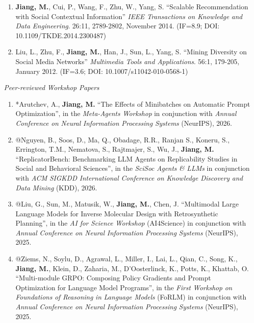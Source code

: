 \documentclass[10pt]{article}
\newenvironment{myindentpar}[1]%
{\begin{list}{}%
         {\setlength{\leftmargin}{#1}}%
         \item[]%
}
{\end{list}}
\newcounter{list}
\begin{document}
\begin{myindentpar}{0.00cm}
\begin{enumerate}[leftmargin=.5cm]
\item[J2] \textbf{Jiang, M.}, Cui, P., Wang, F., Zhu, W., Yang, S. ``Scalable Recommendation with Social Contextual Information'' \textit{IEEE Transactions on Knowledge and Data Engineering}. 26:11, 2789-2802, November 2014. (IF=8.9; DOI: 10.1109/TKDE.2014.2300487)

\item[J1] Liu, L., Zhu, F., \textbf{Jiang, M.}, Han, J., Sun, L., Yang, S. ``Mining Diversity on Social Media Networks'' \textit{Multimedia Tools and Applications}. 56:1, 179-205, January 2012. (IF=3.6; DOI: 10.1007/s11042-010-0568-1)

\end{enumerate}

\hspace{-0.25cm}\textit{Peer-reviewed Workshop Papers}

\begin{enumerate}[leftmargin=.5cm]

\item[W42] *Arutchev, A., \textbf{Jiang, M.} ``The Effects of Minibatches on Automatic Prompt Optimization'', in the \textit{Meta-Agents Workshop} in conjunction with \textit{Annual Conference on Neural Information Processing Systems} (NeurIPS), 2026.

\item[W41] @Nguyen, B., Soos, D., Ma, Q., Obadage, R.R., Ranjan S., Koneru, S., Errington, T.M., Nematova, S., Rajtmajer, S., Wu, J., \textbf{Jiang, M.} ``ReplicatorBench: Benchmarking LLM Agents on Replicability Studies in Social and Behavioral Sciences'', in the \textit{SciSoc Agents \& LLMs} in conjunction with \textit{ACM SIGKDD International Conference on Knowledge Discovery and Data Mining} (KDD), 2026.

\item[W40] @Liu, G., Sun, M., Matusik, W., \textbf{Jiang, M.}, Chen, J. ``Multimodal Large Language Models for Inverse Molecular Design with Retrosynthetic Planning'', in the \textit{AI for Science Workshop} (AI4Science) in conjunction with \textit{Annual Conference on Neural Information Processing Systems} (NeurIPS), 2025.

\item[W39] @Ziems, N., Soylu, D., Agrawal, L., Miller, I., Lai, L., Qian, C., Song, K., \textbf{Jiang, M.}, Klein, D., Zaharia, M., D'Oosterlinck, K., Potts, K., Khattab, O. ``Multi-module GRPO: Composing Policy Gradients and Prompt Optimization for Language Model Programs'', in the \textit{First Workshop on Foundations of Reasoning in Language Models} (FoRLM) in conjunction with \textit{Annual Conference on Neural Information Processing Systems} (NeurIPS), 2025.


\end{enumerate}
\end{myindentpar}
\end{document}
